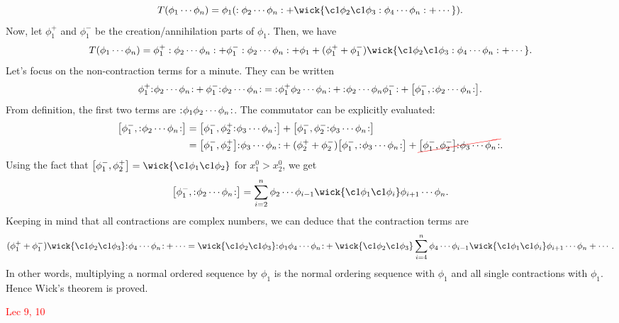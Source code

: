 \documentclass{article}
\begin{document}
$$T(\phi_1\cdots\phi_n)=\phi_1(:\phi_2\cdots\phi_n:+\wick{\c1\phi_2\c1\phi_3:\phi_4\cdots\phi_n:+\cdots}).$$
Now, let $\phi_1^+$ and $\phi_1^-$ be the creation/annihilation parts of $\phi_1$. Then, we have 
\begin{align*}
    T(\phi_1\cdots\phi_n)=\phi_1^+:\phi_2\cdots\phi_n:+\phi_1^-:\phi_2\cdots\phi_n:+\phi_1+(\phi^+_1+\phi^-_1)\wick{\c1\phi_2\c1\phi_3:\phi_4\cdots\phi_n:+\cdots}.
\end{align*}
Let's focus on the non-contraction terms for a minute. They can be written 
$$\phi^+_1\normord{\phi_2\cdots\phi_n}+\phi^-_1\normord{\phi_2\cdots\phi_n}=\normord{\phi^+_1\phi_2\cdots\phi_n}+\normord{\phi_2\cdots\phi_n\phi^-_1}+\comm{\phi^-_1}{\normord{\phi_2\cdots\phi_n}}.$$
From definition, the first two terms are ${:}\mkern1mu\phi_1\phi_2\cdots\phi_n\mkern1.6mu{:}$. The commutator can be explicitly evaluated:
\begin{align*}
    \comm{\phi^-_1}{\normord{\phi_2\cdots\phi_n}}&=\comm{\phi^-_1}{\phi^+_2\normord{\phi_3\cdots\phi_n}}+\comm{\phi^-_1}{\phi^-_2\normord{\phi_3\cdots\phi_n}}\\
    &=\comm{\phi^-_1}{\phi^+_2}\normord{\phi_3\cdots\phi_n}+(\phi^+_2+\phi^-_2)\comm{\phi^-_1}{\normord{\phi_3\cdots\phi_n}}+\Ccancel[red]{\comm{\phi^-_1}{\phi^-_2}\normord{\phi_3\cdots\phi_n}}.
\end{align*}
Using the fact that $\comm{\phi^-_1}{\phi^+_2}=\wick{\c1\phi_1\c1\phi_2}$ for $x^0_1>x^0_2$, we get 
$$\comm{\phi^-_1}{\normord{\phi_2\cdots\phi_n}}=\sum^n_{i=2}\phi_2\cdots\phi_{i-1}\wick{\c1\phi_1\c1\phi_i}\phi_{i+1}\cdots\phi_n.$$
Keeping in mind that all contractions are complex numbers, we can deduce that the contraction terms are 
$$(\phi^+_1+\phi^-_1)\wick{\c1\phi_2\c1\phi_3}\normord{\phi_4\cdots\phi_n}+\cdots=\wick{\c1\phi_2\c1\phi_3}\normord{\phi_1\phi_4\cdots\phi_n}+\wick{\c1\phi_2\c1\phi_3}\sum^n_{i=4}\phi_4\cdots\phi_{i-1}\wick{\c1\phi_1\c1\phi_i}\phi_{i+1}\cdots\phi_n+\cdots.$$
In other words, multiplying a normal ordered sequence by $\phi_1$ is the normal ordering sequence with $\phi_1$ and all single contractions with $\phi_1$. Hence Wick's theorem is proved.


\textcolor{red}{Lec 9, 10}
\end{document}
